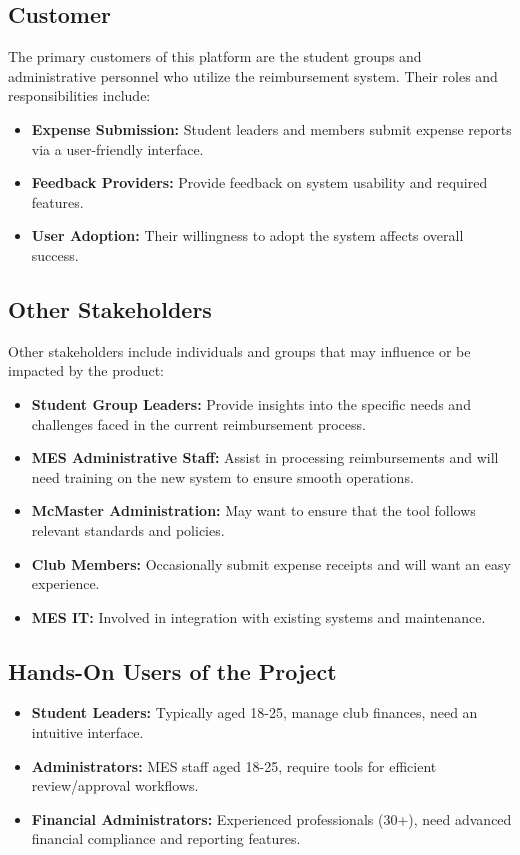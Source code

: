 \documentclass[12pt]{article}
\begin{document}
\subsection{Customer}
The primary customers of this platform are the student groups and administrative personnel who utilize the reimbursement system. Their roles and responsibilities include:
\begin{itemize}
    \item \textbf{Expense Submission:} Student leaders and members submit expense reports via a user-friendly interface.
    \item \textbf{Feedback Providers:} Provide feedback on system usability and required features.
    \item \textbf{User Adoption:} Their willingness to adopt the system affects overall success.
\end{itemize}

\subsection{Other Stakeholders}
Other stakeholders include individuals and groups that may influence or be impacted by the product:
\begin{itemize}
    \item \textbf{Student Group Leaders:} Provide insights into the specific needs and challenges faced in the current reimbursement process.
    \item \textbf{MES Administrative Staff:} Assist in processing reimbursements and will need training on the new system to ensure smooth operations.
    \item \textbf{McMaster Administration:} May want to ensure that the tool follows relevant standards and policies.
    \item \textbf{Club Members:} Occasionally submit expense receipts and will want an easy experience.
    \item \textbf{MES IT:} Involved in integration with existing systems and maintenance.
\end{itemize}

\subsection{Hands-On Users of the Project}
\begin{itemize}
    \item \textbf{Student Leaders:} Typically aged 18-25, manage club finances, need an intuitive interface.
    \item \textbf{Administrators:} MES staff aged 18-25, require tools for efficient review/approval workflows.
    \item \textbf{Financial Administrators:} Experienced professionals (30+), need advanced financial compliance and reporting features.
\end{itemize}
\end{document}
